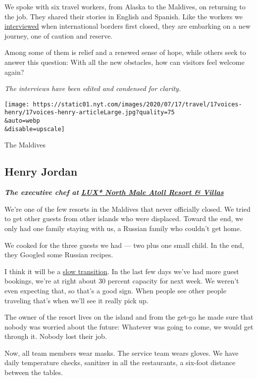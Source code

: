 We spoke with six travel workers, from Alaska to the Maldives, on
returning to the job. They shared their stories in English and Spanish.
Like the workers we
\href{https://www.nytimes.com/2020/03/25/travel/coronavirus-travel-hospitality-workers.html}{interviewed}
when international borders first closed, they are embarking on a new
journey, one of caution and reserve.

Among some of them is relief and a renewed sense of hope, while others
seek to answer this question: With all the new obstacles, how can
visitors feel welcome again?

\emph{The interviews have been edited and condensed for clarity.}

\texttt{[image: https://static01.nyt.com/images/2020/07/17/travel/17voices-henry/17voices-henry-articleLarge.jpg?quality=75\\\&auto=webp\\\&disable=upscale]}

The Maldives

\hypertarget{henry-jordan}{%
\subsection{Henry Jordan}\label{henry-jordan}}

\emph{\textbf{The executive chef at}}
\textbf{\href{https://www.luxresorts.com/en/maldives/hotel/luxnorthmaleatoll}{\emph{LUX*
North Male Atoll Resort \& Villas}}}

We're one of the few resorts in the Maldives that never officially
closed. We tried to get other guests from other islands who were
displaced. Toward the end, we only had one family staying with us, a
Russian family who couldn't get home.

We cooked for the three guests we had --- two plus one small child. In
the end, they Googled some Russian recipes.

I think it will be a
\href{http://www.tourism.gov.mv/en/news/maldives_welcomes_back_first_tourists}{slow
transition}. In the last few days we've had more guest bookings, we're
at right about 30 percent capacity for next week. We weren't even
expecting that, so that's a good sign. When people see other people
traveling that's when we'll see it really pick up.

The owner of the resort lives on the island and from the get-go he made
sure that nobody was worried about the future: Whatever was going to
come, we would get through it. Nobody lost their job.

Now, all team members wear masks. The service team wears gloves. We have
daily temperature checks, sanitizer in all the restaurants, a six-foot
distance between the tables.

